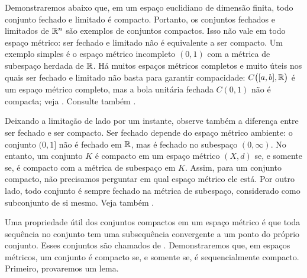 \begin{myfigureht}
\caption{Demonstração de que um conjunto compacto é limitado (à esquerda)
e fechado (à direita).\label{fig:compactbndclosed}}
\end{myfigureht}

Demonstraremos abaixo que, em um espaço euclidiano de dimensão finita,
todo conjunto fechado e limitado é compacto. Portanto, os conjuntos fechados
e limitados de ${\mathbb{R}}^n$ são exemplos de conjuntos compactos.
Isso não vale em todo espaço métrico: ser fechado e limitado não é
equivalente a ser compacto. Um exemplo simples é o espaço métrico incompleto
$(0,1)$ com a métrica de subespaço herdada de ${\mathbb{R}}$.
Há muitos espaços métricos completos e muito úteis nos quais ser fechado e
limitado não basta para garantir compacidade: $C\bigl([a,b],{\mathbb{R}}\bigr)$ é um
espaço métrico completo, mas a bola unitária fechada $C(0,1)$ não é compacta;
veja . Consulte também
.

Deixando a limitação de lado por um instante, observe também a diferença
entre ser fechado e ser compacto. Ser fechado depende do espaço métrico
ambiente: o conjunto $(0,1]$ não é fechado em ${\mathbb{R}}$, mas é fechado no
subespaço $(0,\infty)$.
No entanto, um conjunto $K$ é compacto em um espaço métrico $(X,d)$ se, e
somente se, é compacto com a métrica de subespaço em $K$. Assim, para um
conjunto compacto, não precisamos perguntar em qual espaço métrico ele está.
Por outro lado, todo conjunto é sempre fechado na métrica de subespaço,
considerado como subconjunto de si mesmo.
Veja também .

Uma propriedade útil dos conjuntos compactos em um espaço métrico é que toda
sequência no conjunto tem uma subsequência convergente a um ponto do próprio
conjunto.
Esses conjuntos são chamados de
\emph{}.
Demonstraremos que, em espaços métricos, um conjunto é compacto se, e
somente se, é sequencialmente compacto.
Primeiro, provaremos um lema.


